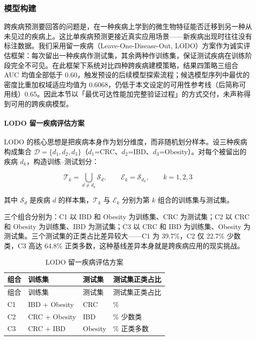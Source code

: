 \documentclass{../../latex/templates/mcm-paper}
\begin{document}
\subsubsection{模型构建}

跨疾病预测要回答的问题是，在一种疾病上学到的微生物特征能否迁移到另一种从未见过的疾病上。这比单疾病预测更接近真实应用场景——新疾病出现时往往没有标注数据。我们采用留一疾病（Leave-One-Disease-Out, LODO）方案作为诚实评估框架：每次留出一种疾病作测试集，其余两种作训练集，保证测试疾病在训练阶段完全不可见。在此框架下系统对比四种跨疾病建模策略，结果四策略三组合 AUC 均值全部低于 0.60，触发预设的后续模型探索流程；候选模型序列中最优的密度比重加权域适应均值为 0.6068，仍低于本文设定的可用性参考线（后简称可用线）0.65。因此本节以「最优可达性能加完整验证过程」的方式交付，未声称得到可用的跨疾病模型。

\paragraph{LODO 留一疾病评估方案}

LODO 的核心思想是把疾病本身作为划分维度，而非随机划分样本。设三种疾病构成集合 $\mathcal{D}=\{d_1,d_2,d_3\}$（$d_1$=CRC、$d_2$=IBD、$d_3$=Obesity）。对每个被留出的疾病 $d_k$，构造训练–测试划分：

\begin{equation}
\mathcal{T}_k = \bigcup_{d\neq d_k} \mathcal{S}_d, \qquad \mathcal{E}_k = \mathcal{S}_{d_k}, \qquad k=1,2,3
\label{eq:s3-lodo}
\end{equation}

其中 $\mathcal{S}_d$ 是疾病 $d$ 的样本集，$\mathcal{T}_k$ 与 $\mathcal{E}_k$ 分别为第 $k$ 组合的训练集与测试集。

三个组合分别为：C1 以 IBD 和 Obesity 为训练集、CRC 为测试集；C2 以 CRC 和 Obesity 为训练集、IBD 为测试集；C3 以 CRC 和 IBD 为训练集、Obesity 为测试集。三个测试集的正类占比差异较大——C1 为 39.7\%，C2 仅 22.7\% 少数类，C3 高达 64.8\% 正类多数，这种基线差异本身就是跨疾病应用的现实挑战。

{\small
\begin{longtable}{>{\centering\arraybackslash}p{}>{\centering\arraybackslash}p{}>{\centering\arraybackslash}p{}>{\centering\arraybackslash}p{}}
\caption{LODO 留一疾病评估方案}\label{tab:s3-lodo}\\
\toprule
组合 & 训练集 & 测试集 & 测试集正类占比 \\
\midrule
\endfirsthead
\toprule
组合 & 训练集 & 测试集 & 测试集正类占比 \\
\midrule
\endhead
\bottomrule
\endlastfoot
C1 & IBD + Obesity & CRC & 39.7\% \\
C2 & CRC + Obesity & IBD & 22.7\% 少数类 \\
C3 & CRC + IBD & Obesity & 64.8\% 正类多数 \\
\end{longtable}
}
\end{document}
